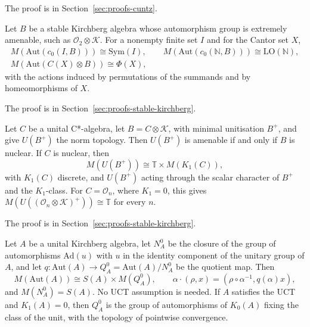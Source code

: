 The proof is in Section~\ref{sec:proofs-cuntz}.

\begin{theorem}\label{thm:lupini-stable-geometric}
Let $B$ be a stable Kirchberg algebra whose automorphism group is extremely
amenable, such as $\mathcal{O}_2\otimes\mathcal{K}$. For a nonempty finite set
$I$ and for the Cantor set $X$,
\[
\begin{gathered}
M(\mathrm{Aut}(c_0(I,B)))\cong\mathrm{Sym}(I),\qquad
M(\mathrm{Aut}(c_0(\mathbb{N},B)))\cong\mathrm{LO}(\mathbb{N}),\\
M(\mathrm{Aut}(C(X)\otimes B))\cong\Phi(X),
\end{gathered}
\]
with the actions induced by permutations of the summands and by
homeomorphisms of $X$.
\end{theorem}

The proof is in Section~\ref{sec:proofs-stable-kirchberg}.

\begin{theorem}\label{thm:lupini-stable-norm}
Let $C$ be a unital C*-algebra, let $B=C\otimes\mathcal{K}$, with minimal
unitisation $B^+$, and give $U(B^+)$ the norm topology. Then $U(B^+)$ is
amenable if and only if $B$ is nuclear. If $C$ is nuclear, then
\[
M(U(B^+))\cong\mathbb{T}\times M(K_1(C)),
\]
with $K_1(C)$ discrete, and $U(B^+)$ acting through the scalar character of
$B^+$ and the $K_1$-class. For $C=\mathcal{O}_n$, where $K_1=0$, this gives
$M(U((\mathcal{O}_n\otimes\mathcal{K})^+))\cong\mathbb{T}$ for every $n$.
\end{theorem}

The proof is in Section~\ref{sec:proofs-stable-kirchberg}.

\begin{theorem}\label{thm:lupini-unital}
Let $A$ be a unital Kirchberg algebra, let $N^0_A$ be the closure of the
group of automorphisms $\mathrm{Ad}(u)$ with $u$ in the identity component
of the unitary group of $A$, and let $q\colon\mathrm{Aut}(A)\to
Q^0_A=\mathrm{Aut}(A)/N^0_A$ be the quotient map. Then
\[
M(\mathrm{Aut}(A))\cong S(A)\times M(Q^0_A),
\qquad \alpha\cdot(\rho,x)=(\rho\circ\alpha^{-1},q(\alpha)x),
\]
and $M(N^0_A)=S(A)$. No UCT assumption is needed. If $A$ satisfies the UCT
and $K_1(A)=0$, then $Q^0_A$ is the group of automorphisms of $K_0(A)$
fixing the class of the unit, with the topology of pointwise convergence.
\end{theorem}

